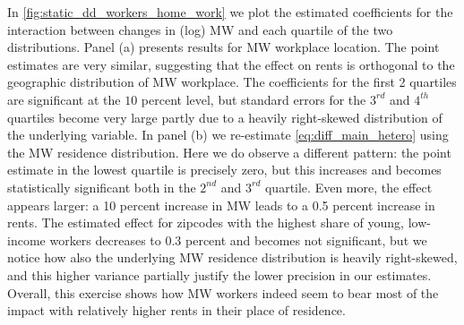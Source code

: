 
In \autoref{fig:static_dd_workers_home_work} we plot the estimated coefficients for the interaction 
between changes in (log) MW and each quartile of the two distributions. Panel (a) presents results 
for MW workplace location. The point estimates are very similar, suggesting that the effect on rents 
is orthogonal to the geographic distribution of MW workplace. The coefficients for the first 2 
quartiles are significant at the $10$ percent level, but standard errors for the $3^{rd}$ and 
$4^{th}$ quartiles become very large partly due to a heavily right-skewed distribution of the 
underlying variable. In panel (b) we re-estimate \autoref{eq:diff_main_hetero} using the MW residence 
distribution. Here we do observe a different pattern: the point estimate in the lowest quartile is 
precisely zero, but this increases and becomes statistically significant both in the $2^{nd}$ and 
$3^{rd}$ quartile. Even more, the effect appears larger: a 10 percent increase in MW leads to a 0.5 
percent increase in rents. The estimated effect for zipcodes with the highest share of young, 
low-income workers decreases to 0.3 percent and becomes not significant, but we notice how also the 
underlying MW residence distribution is heavily right-skewed, and this higher variance partially 
justify the lower precision in our estimates. Overall, this exercise shows how MW workers indeed seem 
to bear most of the impact with relatively higher rents in their place of residence.

